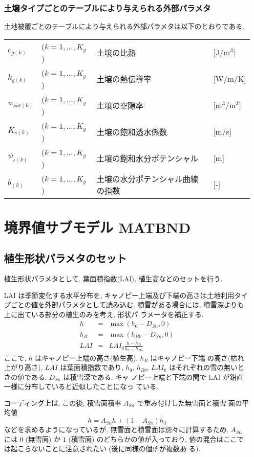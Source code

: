 \subsubsection{土壌タイプごとのテーブルにより与えられる外部パラメタ}

土地被覆ごとのテーブルにより与えられる外部パラメタは以下のとおりである. 

\begin{tabular}{llll}
$c_{g(k)}$ & ($k=1,\ldots,K_g$) & 土壌の比熱 & [J/m$^3$] \\
$k_{g(k)}$ & ($k=1,\ldots,K_g$) & 土壌の熱伝導率 & [W/m/K] \\
$w_{sat(k)}$ & ($k=1,\ldots,K_g$) & 土壌の空隙率 & [m$^3$/m$^3$] \\
$K_{s(k)}$ & ($k=1,\ldots,K_g$) & 土壌の飽和透水係数 & [m/s] \\
$\psi_{s(k)}$ & ($k=1,\ldots,K_g$) & 土壌の飽和水分ポテンシャル & [m] \\
$b_{(k)}$ & ($k=1,\ldots,K_g$) & 土壌の水分ポテンシャル曲線の指数 & [-]
\end{tabular}

\section{境界値サブモデル MATBND}

\subsection{植生形状パラメタのセット}

植生形状パラメタとして, 葉面積指数(LAI), 植生高などのセットを行う. 

LAI は季節変化する水平分布を, キャノピー上端及び下端の高さは土地利用タイ
プごとの値を外部パラメタとして読み込む. 
積雪がある場合には, 積雪深よりも上に出ている部分の植生のみを考え, 形状パ
ラメータを補正する. 
\begin{eqnarray}
 h &=& \max( h_0 - D_{Sn}, 0 ) \\
 h_B &=& \max( h_{B0} - D_{Sn}, 0 ) \\
 LAI &=& LAI_0 \frac{h-h_B}{h_0-h_{B0}}
\end{eqnarray}
ここで, $h$ はキャノピー上端の高さ(植生高), $h_B$ はキャノピー下端
の高さ(枯れ上がり高さ), $LAI$ は葉面積指数であり, $h_0$, $h_{B0}$,
$LAI_0$ はそれぞれの雪の無いときの値である. $D_{Sn}$ は積雪深である. キャ
ノピー上端と下端の間で LAI が鉛直一様に分布していると近似したことになっ
ている. 

コーディング上は, この後, 積雪面積率 $A_{Sn}$ で重み付けした無雪面と積雪
面の平均値
\[
 h = A_{Sn} h + ( 1 - A_{Sn} ) h_0
\]
などを求めるようになっているが, 無雪面と積雪面は別々に計算するため,
$A_{Sn}$ には $0$ (無雪面) か $1$ (積雪面) のどちらかの値が入っており,
値の混合はここでは起こらないことに注意されたい (後に同様の個所が複数あ
る). 

